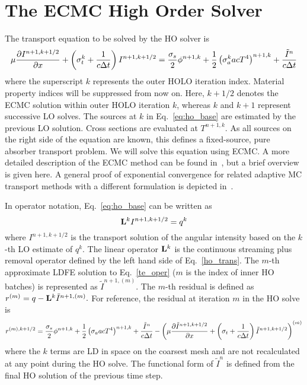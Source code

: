 

\section{The ECMC High Order Solver}

The transport equation to be solved by the HO solver is
\begin{equation}\label{eq:ho_base}
\mu \frac{\partial I^{n+1,k+1/2}}{\partial x} + \left(\sigma_t^k + \frac{1}{c \Delta t }\right)
I^{n+1,k+1/2}
= \frac{\sigma_s}{2} \phi^{n+1,k} +\frac{1}{2} \left(\sigma_a^k a c T^4
\right)^{n+1,k} + \frac{\tilde I^n}{c\Delta t} 
\end{equation}
where the superscript $k$ represents the outer HOLO iteration index.  Material property indices will be
suppressed from now on.  Here, $k+1/2$ denotes the
ECMC solution within outer HOLO iteration $k$, whereas $k$ and $k+1$ represent successive LO
solves. The sources at $k$ in Eq.~\eqref{eq:ho_base} are estimated by the previous LO solution. Cross sections are
evaluated at $T^{n+1,k}$.  As all sources on the right side of the equation are known,
this defines a fixed-source, pure absorber transport problem.  We will solve
this equation using ECMC.  A more detailed description of the
ECMC method can be found in~\cite{jake}, but a brief overview is given here.  A general proof of exponential convergence for related adaptive MC transport methods with a different formulation is depicted in~\cite{spanier_mc}.

 In operator notation, Eq.~\eqref{eq:ho_base} can be written as
\begin{equation}\label{te_oper}
\mathbf{L}^k I^{n+1,k+1/2}  = q^{k}
\end{equation}
where $I^{n+1,k+1/2}$ is the transport solution of the angular intensity based on the
$k$-th LO estimate of $q^k$.
The linear operator $\mathbf{L}^k$ is the continuous streaming plus
removal operator defined by the left hand
side of Eq.~\eqref{ho_trans}.
The $m$-th approximate LDFE solution to Eq.~\eqref{te_oper} ($m$ is the index of inner HO
batches) is represented as
$\tilde{I}^{n+1,(m)}$.    
The $m$-th residual is defined as $r^{(m)} = q - \mathbf{L}^k\tilde{I}^{n+1,(m)}.$ 
For reference, the residual at iteration $m$ in the HO solve
is
\begin{equation}\label{eq:resid}
r^{(m),k+1/2} = \frac{\sigma_s}{2} \phi^{n+1,k} +\frac{1}{2} \left(\sigma_a a c T^4
\right)^{n+1,k} + \frac{\tilde{I}^n}{c \Delta t } -
\left(\mu \frac{\partial \tilde{I}^{n+1,k+1/2}}{\partial x} +
\left(\sigma_t + \frac{1}{c \Delta t }\right) \tilde{I}^{n+1,k+1/2}\right)^{(m)}
\end{equation}
where the $k$ terms are LD in space on the coarsest mesh and are not recalculated at any point during
the HO solve. The functional form of $\tilde{I}^n$ is defined from the final HO
solution of the previous time step.  

